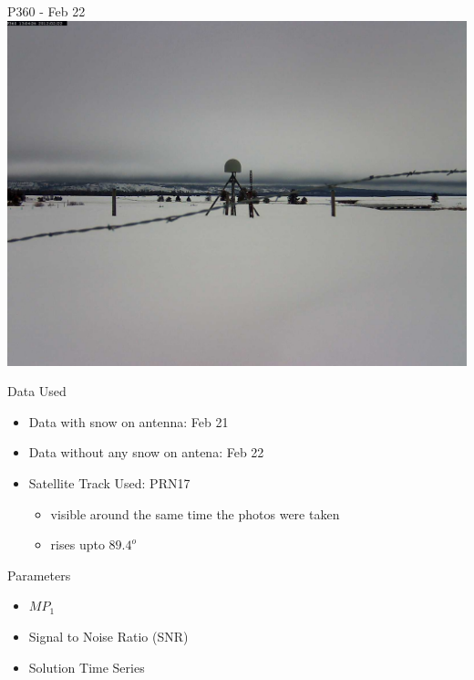 \documentclass{beamer}
\begin{document}
\begin{frame}{P360 - Feb 22}
\includegraphics[width=9\linewidth,trim=100 600 100 600]{img/P36020120222_130426M.jpg}
\end{frame}


\begin{frame}{Data Used}
\begin{itemize}
  \item Data with snow on antenna: Feb 21
  \item Data without any snow on antena: Feb 22
  \item Satellite Track Used: PRN17 
    \begin{itemize}
      \item visible around the same time the photos were taken
      \item rises upto $89.4^o$
    \end{itemize}
\end{itemize}
\end{frame}


\begin{frame}{Parameters}
\begin{itemize}
  \item $MP_1$
  \item Signal to Noise Ratio (SNR)
  \item Solution Time Series
\end{itemize}
\end{frame}
\end{document}
